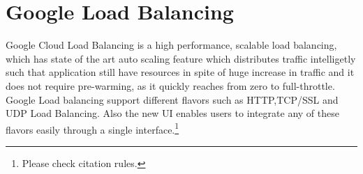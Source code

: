 \section{Google Load Balancing}

Google Cloud Load Balancing is a high performance, scalable load balancing, 
which has state of the art auto scaling feature which distributes traffic 
intelligetly such that application still have resources in spite of huge increase 
in traffic and it does not require pre-warming, as it quickly reaches 
from zero to full-throttle. 
Google Load balancing support different flavors such as HTTP,TCP/SSL and UDP 
Load Balancing. Also the new UI enables users to integrate any of these flavors 
easily through a single interface.\cite{hid-sp18-602-loadbalancing-main}\footnote{Please check citation rules.}

